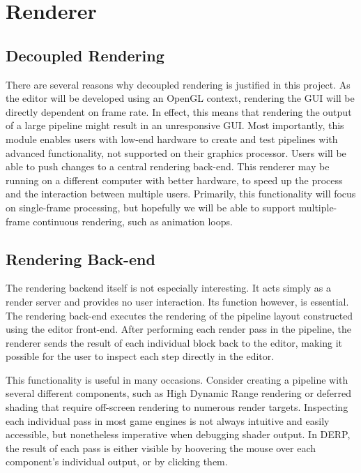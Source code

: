 
\chapter{Renderer}

\section{Decoupled Rendering}
There are several reasons why decoupled rendering is justified in this project. As the editor will be developed using an OpenGL context, rendering the GUI will be directly dependent on frame rate. In effect, this means that rendering the output of a large pipeline might result in an unresponsive GUI.
Most importantly, this module enables users with low-end hardware to create and test pipelines with advanced functionality, not supported on their graphics processor. Users will be able to push changes to a central rendering back-end. This renderer may be running on a different computer with better hardware, to speed up the process and the interaction between multiple users.  Primarily, this functionality will focus on single-frame processing, but hopefully we will be able to support multiple-frame continuous rendering, such as animation loops. 

\section{Rendering Back-end}
The rendering backend itself is not especially interesting. It acts simply as a render server and provides no user interaction. Its function however, is essential. The rendering back-end executes the rendering of the pipeline layout constructed using the editor front-end. After performing each render pass in the pipeline, the renderer sends the result of each individual block back to the editor, making it possible for the user to inspect each step directly in the editor. 

This functionality is useful in many occasions. Consider creating a pipeline with several different components, such as High Dynamic Range rendering or deferred shading that require off-screen rendering to numerous render targets. Inspecting each individual pass in most game engines is not always intuitive and easily accessible, but nonetheless imperative when debugging shader output. In DERP, the result of each pass is either visible by hoovering the mouse over each component's individual output, or by clicking them. 